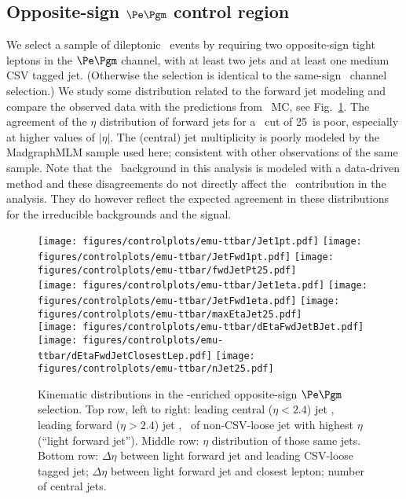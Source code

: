 \subsection{Opposite-sign $\Pe\Pgm$ control region}\label{app:fwdcontrol}
We select a sample of dileptonic \ttbar\ events by requiring two opposite-sign tight leptons in the $\Pe\Pgm$ channel, with at least two jets and at least one medium CSV tagged jet. (Otherwise the selection is identical to the same-sign \emu\ channel selection.)
We study some distribution related to the forward jet modeling and compare the observed data with the predictions from \ttbar\ MC, see Fig.~\ref{fig:osemu-ttbar}.
The agreement of the $\eta$ distribution of forward jets for a \pt\ cut of 25\GeV\ is poor, especially at higher values of $|\eta|$.
The (central) jet multiplicity is poorly modeled by the MadgraphMLM sample used here; consistent with other observations of the same sample.
Note that the \ttbar\ background in this analysis is modeled with a data-driven method and these disagreements do not directly affect the \ttbar\ contribution in the analysis.
They do however reflect the expected agreement in these distributions for the irreducible backgrounds and the signal.
\begin{figure} [!h]
  \centering
  \texttt{[image: figures/controlplots/emu-ttbar/Jet1pt.pdf]}
  \texttt{[image: figures/controlplots/emu-ttbar/JetFwd1pt.pdf]}
  \texttt{[image: figures/controlplots/emu-ttbar/fwdJetPt25.pdf]} \\
  \texttt{[image: figures/controlplots/emu-ttbar/Jet1eta.pdf]}
  \texttt{[image: figures/controlplots/emu-ttbar/JetFwd1eta.pdf]}
  \texttt{[image: figures/controlplots/emu-ttbar/maxEtaJet25.pdf]} \\
  \texttt{[image: figures/controlplots/emu-ttbar/dEtaFwdJetBJet.pdf]}
  \texttt{[image: figures/controlplots/emu-ttbar/dEtaFwdJetClosestLep.pdf]}
  \texttt{[image: figures/controlplots/emu-ttbar/nJet25.pdf]} \\
\caption{Kinematic distributions in the \ttbar-enriched opposite-sign $\Pe\Pgm$ selection. Top row, left to right: leading central ($\eta<2.4$) jet \pt, leading forward ($\eta>2.4$) jet \pt, \pt\ of non-CSV-loose jet with highest $\eta$ (``light forward jet''). Middle row: $\eta$ distribution of those same jets. Bottom row: $\Delta\eta$ between light forward jet and leading CSV-loose tagged jet; $\Delta\eta$ between light forward jet and closest lepton; number of central jets.}
\label{fig:osemu-ttbar}
\end{figure}


